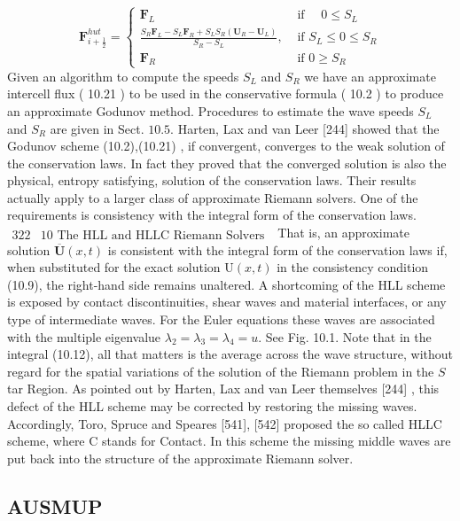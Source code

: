 $$
\mathbf{F}_{i+\frac{1}{2}}^{h u t}=\left\{\begin{array}{cl}
\mathbf{F}_{L} & \text { if } \quad 0 \leq S_{L} \\
\frac{S_{R} \mathbf{F}_{L}-S_{L} \mathbf{F}_{R}+S_{L} S_{R}\left(\mathbf{U}_{R}-\mathbf{U}_{L}\right)}{S_{R}-S_{L}}, & \text { if } S_{L} \leq 0 \leq S_{R} \\
\mathbf{F}_{R} & \text { if } 0 \geq S_{R}
\end{array}\right.
$$
Given an algorithm to compute the speeds $S_{L}$ and $S_{R}$ we have an approximate intercell flux ( 10.21 ) to be used in the conservative formula ( 10.2 ) to produce an approximate Godunov method. Procedures to estimate the wave speeds $S_{L}$ and $S_{R}$ are given in Sect. $10.5 .$ Harten, Lax and van Leer [244] showed that the Godunov scheme (10.2),(10.21) , if convergent, converges to the weak solution of the conservation laws. In fact they proved that the converged solution is also the physical, entropy satisfying, solution of the conservation laws. Their results actually apply to a larger class of approximate Riemann solvers. One of the requirements is consistency with the integral form of the conservation laws.
$\begin{array}{ll}322 & 10 \text { The HLL and HLLC Riemann Solvers }\end{array}$
That is, an approximate solution $\overline{\mathbf{U}}(x, t)$ is consistent with the integral form of the conservation laws if, when substituted for the exact solution $\mathrm{U}(x, t)$ in the consistency condition (10.9), the right-hand side remains unaltered. A shortcoming of the HLL scheme is exposed by contact discontinuities, shear waves and material interfaces, or any type of intermediate waves. For the Euler equations these waves are associated with the multiple eigenvalue $\lambda_{2}=\lambda_{3}=\lambda_{4}=u$. See Fig. 10.1. Note that in the integral (10.12), all that matters is the average across the wave structure, without regard for the spatial variations of the solution of the Riemann problem in the $S$ tar Region. As pointed out by Harten, Lax and van Leer themselves [244] , this defect of the HLL scheme may be corrected by restoring the missing waves. Accordingly, Toro, Spruce and Speares [541], [542] proposed the so called HLLC scheme, where $\mathrm{C}$ stands for Contact. In this scheme the missing middle waves are put back into the structure of the approximate Riemann solver.


\subsection{AUSMUP}

